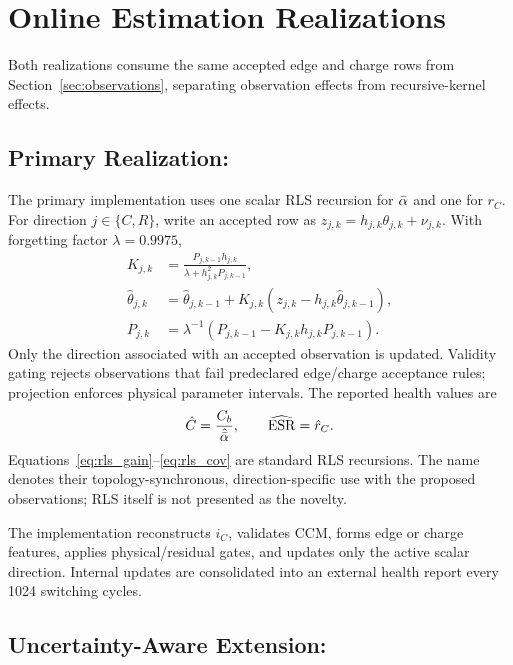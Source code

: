 \section{Online Estimation Realizations}
\label{sec:estimators}

Both realizations consume the same accepted edge and charge rows from Section~\ref{sec:observations}, separating observation effects from recursive-kernel effects.

\subsection{Primary Realization: \TSRLS{}}

The primary implementation uses one scalar RLS recursion for $\bar{\alpha}$ and one for $r_C$. For direction $j\in\{C,R\}$, write an accepted row as $z_{j,k}=h_{j,k}\theta_{j,k}+\nu_{j,k}$. With forgetting factor $\lambda=0.9975$,
\begin{align}
K_{j,k}&=\frac{P_{j,k-1}h_{j,k}}
{\lambda+h_{j,k}^{2}P_{j,k-1}},
\label{eq:rls_gain}\\
\hat\theta_{j,k}&=\hat\theta_{j,k-1}
+K_{j,k}(z_{j,k}-h_{j,k}\hat\theta_{j,k-1}),
\label{eq:rls_state}\\
P_{j,k}&=\lambda^{-1}(P_{j,k-1}-K_{j,k}h_{j,k}P_{j,k-1}).
\label{eq:rls_cov}
\end{align}
Only the direction associated with an accepted observation is updated. Validity gating rejects observations that fail predeclared edge/charge acceptance rules; projection enforces physical parameter intervals. The reported health values are
\begin{equation}
\hat C=\frac{C_b}{\hat{\bar{\alpha}}},\qquad
\widehat{\mathrm{ESR}}=\hat r_C.
\label{eq:health_outputs}
\end{equation}
Equations~\eqref{eq:rls_gain}--\eqref{eq:rls_cov} are standard RLS recursions. The \TSRLS{} name denotes their topology-synchronous, direction-specific use with the proposed observations; RLS itself is not presented as the novelty.

The implementation reconstructs $i_C$, validates CCM, forms edge or charge features, applies physical/residual gates, and updates only the active scalar direction. Internal updates are consolidated into an external health report every 1024 switching cycles.

\subsection{Uncertainty-Aware Extension: \TSKF{}}

